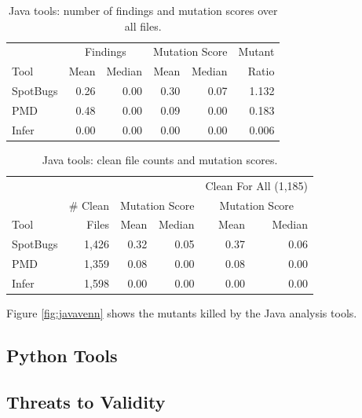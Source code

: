 \begin{table}
  \begin{tabular}{l|r|r|r|r|r}
    & \multicolumn{2}{|c|}{Findings} & \multicolumn{2}{|c|}{Mutation Score}  & Mutant \\
    Tool & Mean & Median & Mean & Median & Ratio\\
    \hline
    \hline
    SpotBugs & 0.26 & 0.00 & 0.30 & 0.07 & 1.132 \\
    \hline
    PMD & 0.48 & 0.00 & 0.09 & 0.00 & 0.183 \\
    \hline
    Infer & 0.00 & 0.00 & 0.00 & 0.00 &  0.006 \\
    \hline
  \end{tabular}
  \caption{Java tools: number of findings and mutation scores over all files.}
  \label{tab:scorejava}
\end{table}

\begin{table}
  \begin{tabular}{l|r|r|r|r|r}
    & & \multicolumn{2}{|c|}{} & \multicolumn{2}{|c}{Clean For All (1,185)} \\
    & \# Clean & \multicolumn{2}{|c|}{Mutation Score} &  \multicolumn{2}{|c}{Mutation Score}\\
    Tool & Files & Mean & Median & Mean & Median\\
    \hline
    \hline
    SpotBugs & 1,426 & 0.32 & 0.05 & 0.37 & 0.06 \\
    \hline
    PMD & 1,359 & 0.08 & 0.00 & 0.08 & 0.00 \\
    \hline
    Infer & 1,598 & 0.00 & 0.00 & 0.00 & 0.00 \\
    \hline
  \end{tabular}
  \caption{Java tools: clean file counts and mutation scores.}
  \label{tab:cleanjava}
\end{table}

Figure \ref{fig:javavenn} shows the mutants killed by the Java analysis tools.

\subsection{Python Tools}

\subsection{Threats to Validity}